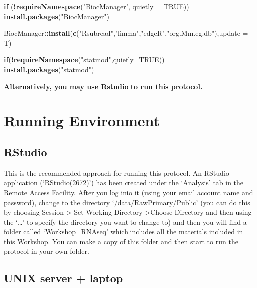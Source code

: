 \documentclass[]{book}
\newenvironment{Shaded}{\begin{snugshade}}{\end{snugshade}}
\newcommand{\ControlFlowTok}[1]{\textcolor[rgb]{0.13,0.29,0.53}{\textbf{#1}}}
\newcommand{\DataTypeTok}[1]{\textcolor[rgb]{0.13,0.29,0.53}{#1}}
\newcommand{\KeywordTok}[1]{\textcolor[rgb]{0.13,0.29,0.53}{\textbf{#1}}}
\newcommand{\NormalTok}[1]{#1}
\newcommand{\OperatorTok}[1]{\textcolor[rgb]{0.81,0.36,0.00}{\textbf{#1}}}
\newcommand{\OtherTok}[1]{\textcolor[rgb]{0.56,0.35,0.01}{#1}}
\newcommand{\StringTok}[1]{\textcolor[rgb]{0.31,0.60,0.02}{#1}}
\begin{document}
\begin{Shaded}
\begin{Highlighting}[]
\ControlFlowTok{if}\NormalTok{ (}\OperatorTok{!}\KeywordTok{requireNamespace}\NormalTok{(}\StringTok{"BiocManager"}\NormalTok{, }\DataTypeTok{quietly =} \OtherTok{TRUE}\NormalTok{))}
\KeywordTok{install.packages}\NormalTok{(}\StringTok{"BiocManager"}\NormalTok{)}

\NormalTok{BiocManager}\OperatorTok{::}\KeywordTok{install}\NormalTok{(}\KeywordTok{c}\NormalTok{(}\StringTok{"Rsubread"}\NormalTok{,}\StringTok{"limma"}\NormalTok{,}\StringTok{"edgeR"}\NormalTok{,}\StringTok{"org.Mm.eg.db"}\NormalTok{),}\DataTypeTok{update =}\NormalTok{ T)}

\ControlFlowTok{if}\NormalTok{(}\OperatorTok{!}\KeywordTok{requireNamespace}\NormalTok{(}\StringTok{"statmod"}\NormalTok{,}\DataTypeTok{quietly=}\OtherTok{TRUE}\NormalTok{))}
  \KeywordTok{install.packages}\NormalTok{(}\StringTok{"statmod"}\NormalTok{)}
\end{Highlighting}
\end{Shaded}

\textbf{Alternatively, you may use \href{https://rstudio.com/}{Rstudio} to run this protocol.}

\hypertarget{running-environment}{%
\chapter{Running Environment}\label{running-environment}}

\hypertarget{rstudio}{%
\section{RStudio}\label{rstudio}}

This is the recommended approach for running this protocol. An RStudio application (`RStudio(2672)') has been created under the `Analysis' tab in the Remote Access Facility. After you log into it (using your email account name and password), change to the directory `/data/RawPrimary/Public' (you can do this by choosing Session \textgreater{} Set Working Directory \textgreater{}Choose Directory and then using the `\ldots{}' to specify the directory you want to change to) and then
you will find a folder called `Workshop\_RNAseq' which includes all the materials included in this Workshop. You can make a copy of this folder and then start to run the protocol in your own folder.

\hypertarget{unix-server-laptop}{%
\section{UNIX server + laptop}\label{unix-server-laptop}}
\end{document}
